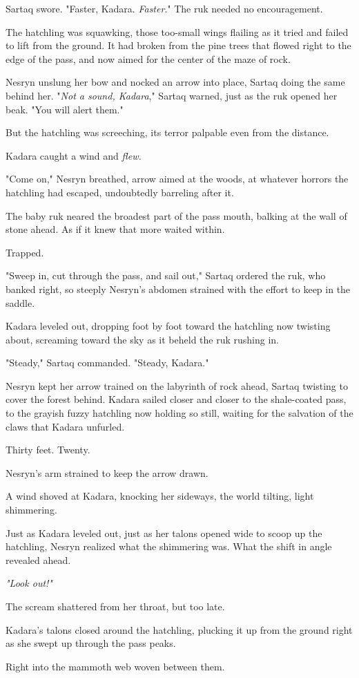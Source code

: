 Sartaq swore. "Faster, Kadara. \emph{Faster}." The ruk needed no encouragement.

The hatchling was squawking, those too-small wings flailing as it tried and failed to lift from the ground. It had broken from the pine trees that flowed right to the edge of the pass, and now aimed for the center of the maze of rock.

Nesryn unslung her bow and nocked an arrow into place, Sartaq doing the same behind her. "\emph{Not a sound, Kadara}," Sartaq warned, just as the ruk opened her beak. "You will alert them."

But the hatchling was screeching, its terror palpable even from the distance.

Kadara caught a wind and \emph{flew.}

"Come on," Nesryn breathed, arrow aimed at the woods, at whatever horrors the hatchling had escaped, undoubtedly barreling after it.

The baby ruk neared the broadest part of the pass mouth, balking at the wall of stone ahead. As if it knew that more waited within.

Trapped.

"Sweep in, cut through the pass, and sail out," Sartaq ordered the ruk, who banked right, so steeply Nesryn's abdomen strained with the effort to keep in the saddle.

Kadara leveled out, dropping foot by foot toward the hatchling now twisting about, screaming toward the sky as it beheld the ruk rushing in.

"Steady," Sartaq commanded. "Steady, Kadara."

Nesryn kept her arrow trained on the labyrinth of rock ahead, Sartaq twisting to cover the forest behind. Kadara sailed closer and closer to the shale-coated pass, to the grayish fuzzy hatchling now holding so still, waiting for the salvation of the claws that Kadara unfurled.

Thirty feet. Twenty.

Nesryn's arm strained to keep the arrow drawn.

A wind shoved at Kadara, knocking her sideways, the world tilting, light shimmering.

Just as Kadara leveled out, just as her talons opened wide to scoop up the hatchling, Nesryn realized what the shimmering was. What the shift in angle revealed ahead.

\emph{"Look out!"}

The scream shattered from her throat, but too late.

Kadara's talons closed around the hatchling, plucking it up from the ground right as she swept up through the pass peaks.

Right into the mammoth web woven between them.

